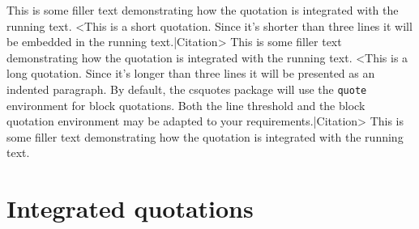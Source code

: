 \documentclass[a4paper]{article}
\newcommand*{\example}[1]{%
  \addvspace{\baselineskip}%
  \par\noindent\hspace{-4em}%
  \makebox[3em][r]{\textbf{Ex. #1}}%
  \hspace{1em}\ignorespaces}
\begin{document}
%
%


\example{7}
This is some filler text demonstrating how the quotation is integrated with
the running text. <This is a short quotation. Since it's shorter than three
lines it will be embedded in the running text.|Citation> This is some filler
text demonstrating how the quotation is integrated with the running text.
<This is a long quotation. Since it's longer than three lines it will be
presented as an indented paragraph. By default, the csquotes package will use
the \texttt{quote} environment for block quotations. Both the line threshold
and the block quotation environment may be adapted to your
requirements.|Citation> This is some filler text demonstrating how the
quotation is integrated with the running text.


\section{Integrated quotations}

%
%
%
%
\end{document}

